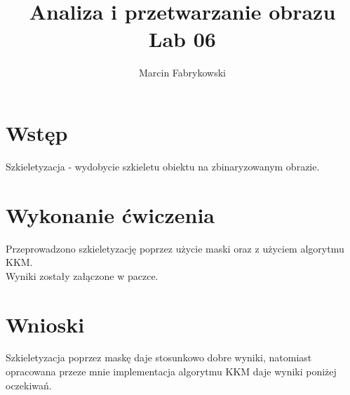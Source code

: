 \documentclass[a4paper, 12pt]{article}
\author{Marcin Fabrykowski}
\title{Analiza i przetwarzanie obrazu\\Lab 06}
\begin{document}
\maketitle
\newpage
\section{Wstęp}
Szkieletyzacja - wydobycie szkieletu obiektu na zbinaryzowanym obrazie.
\section{Wykonanie ćwiczenia}
Przeprowadzono szkieletyzację poprzez użycie maski oraz z użyciem algorytmu KKM.\\
Wyniki zostały załączone w paczce.
\section{Wnioski}
Szkieletyzacja poprzez maskę daje stosunkowo dobre wyniki, natomiast opracowana przeze mnie implementacja algorytmu KKM daje wyniki poniżej oczekiwań.
\end{document}
